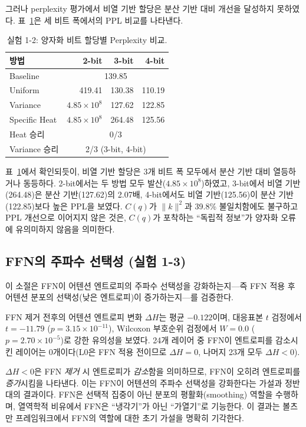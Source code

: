 \documentclass[11pt,a4paper]{article}
\newcommand{\Cq}{C(q)}
\newcommand{\knorm}{\|k\|^2}
\begin{document}
그러나 perplexity 평가에서 비열 기반 할당은 분산 기반 대비 개선을 달성하지 못하였다. 표~\ref{tab:exp12_ppl}은 세 비트 폭에서의 PPL 비교를 나타낸다.

\begin{table}[H]
\centering
\caption{실험 1-2: 양자화 비트 할당별 Perplexity 비교.}
\label{tab:exp12_ppl}
\small
\begin{tabular}{lrrr}
\toprule
\textbf{방법} & \textbf{2-bit} & \textbf{3-bit} & \textbf{4-bit} \\
\midrule
Baseline & \multicolumn{3}{c}{139.85} \\
Uniform & 419.41 & 130.38 & 110.19 \\
Variance & $4.85 \times 10^{8}$ & 127.62 & 122.85 \\
Specific Heat & $4.85 \times 10^{8}$ & 264.48 & 125.56 \\
\midrule
Heat 승리 & \multicolumn{3}{c}{0/3} \\
Variance 승리 & \multicolumn{3}{c}{2/3 (3-bit, 4-bit)} \\
\bottomrule
\end{tabular}
\end{table}

표~\ref{tab:exp12_ppl}에서 확인되듯이, 비열 기반 할당은 3개 비트 폭 모두에서 분산 기반 대비 열등하거나 동등하다. 2-bit에서는 두 방법 모두 발산($4.85 \times 10^{8}$)하였고, 3-bit에서 비열 기반(264.48)은 분산 기반(127.62)의 2.07배, 4-bit에서도 비열 기반(125.56)이 분산 기반(122.85)보다 높은 PPL을 보였다. $\Cq$가 $\knorm$과 39.8\% 불일치함에도 불구하고 PPL 개선으로 이어지지 않은 것은, $\Cq$가 포착하는 ``독립적 정보''가 양자화 오류에 유의미하지 않음을 의미한다.

\subsection{FFN의 주파수 선택성 (실험 1-3)}

이 소절은 FFN이 어텐션 엔트로피의 주파수 선택성을 강화하는지---즉 FFN 적용 후 어텐션 분포의 선택성(낮은 엔트로피)이 증가하는지---를 검증한다.

FFN 제거 전후의 어텐션 엔트로피 변화 $\Delta H$는 평균 $-0.122$이며, 대응표본 $t$ 검정에서 $t = -11.79$ ($p = 3.15 \times 10^{-11}$), Wilcoxon 부호순위 검정에서 $W = 0.0$ ($p = 2.70 \times 10^{-5}$)로 강한 유의성을 보였다. 24개 레이어 중 FFN이 엔트로피를 감소시킨 레이어는 0개이다(L0은 FFN 적용 전이므로 $\Delta H = 0$, 나머지 23개 모두 $\Delta H < 0$).

$\Delta H < 0$은 FFN \textit{제거} 시 엔트로피가 \textit{감소}함을 의미하므로, FFN이 오히려 엔트로피를 \textit{증가}시킴을 나타낸다. 이는 FFN이 어텐션의 주파수 선택성을 강화한다는 가설과 정반대의 결과이다. FFN은 선택적 집중이 아닌 분포의 평활화(smoothing) 역할을 수행하며, 열역학적 비유에서 FFN은 ``냉각기''가 아닌 ``가열기''로 기능한다. 이 결과는 볼츠만 프레임워크에서 FFN의 역할에 대한 초기 가설을 명확히 기각한다.
\end{document}

